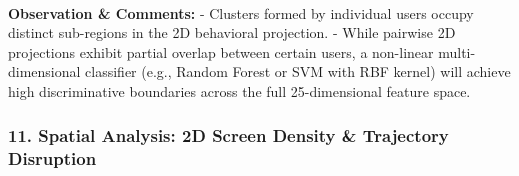 \documentclass[11pt]{article}
\begin{document}
    \begin{center}
    \end{center}
    { \hspace*{\fill} \\}
    
    \textbf{Observation \& Comments:} - Clusters formed by individual users
occupy distinct sub-regions in the 2D behavioral projection. - While
pairwise 2D projections exhibit partial overlap between certain users, a
non-linear multi-dimensional classifier (e.g., Random Forest or SVM with
RBF kernel) will achieve high discriminative boundaries across the full
25-dimensional feature space.

    \subsubsection{11. Spatial Analysis: 2D Screen Density \& Trajectory
Disruption}\label{spatial-analysis-2d-screen-density-trajectory-disruption}
\end{document}

